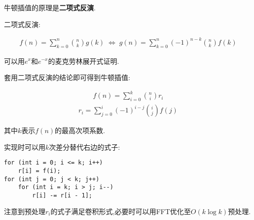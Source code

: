 牛顿插值的原理是\textbf{二项式反演}.

二项式反演: 

$$ \begin{aligned}
f(n)=\sum_{k=0}^n{n\choose k}g(k)\;\Leftrightarrow\;g(n)=\sum_{k=0}^n\left(-1\right)^{n-k}{n\choose k}f(k)
\end{aligned} $$

可以用$e^x$和$e^{-x}$的麦克劳林展开式证明.

套用二项式反演的结论即可得到牛顿插值: 

$$ \begin{aligned} f(n)=\sum_{i=0}^{k}{n\choose i}r_i \end{aligned} $$
$$ \begin{aligned} r_i=\sum_{j=0}^i(-1)^{i-j}{i\choose j}f(j) \end{aligned} $$

其中$k$表示$f(n)$的最高次项系数.

实现时可以用$k$次差分替代右边的式子:

\begin{verbatim}
for (int i = 0; i <= k; i++)
    r[i] = f(i);
for (int j = 0; j < k; j++)
    for (int i = k; i > j; i--)
        r[i] -= r[i - 1];
\end{verbatim}

注意到预处理$r_i$的式子满足卷积形式,必要时可以用FFT优化至$O(k\log k)$预处理.